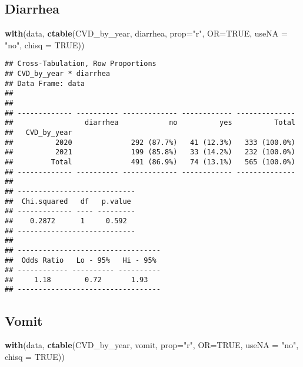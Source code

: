\documentclass[
]{article}
\newenvironment{Shaded}{\begin{snugshade}}{\end{snugshade}}
\newcommand{\AttributeTok}[1]{\textcolor[rgb]{0.13,0.29,0.53}{#1}}
\newcommand{\ConstantTok}[1]{\textcolor[rgb]{0.56,0.35,0.01}{#1}}
\newcommand{\FunctionTok}[1]{\textcolor[rgb]{0.13,0.29,0.53}{\textbf{#1}}}
\newcommand{\NormalTok}[1]{#1}
\newcommand{\StringTok}[1]{\textcolor[rgb]{0.31,0.60,0.02}{#1}}
\begin{document}
\hypertarget{diarrhea}{%
\subsection{Diarrhea}\label{diarrhea}}

\begin{Shaded}
\begin{Highlighting}[]
\FunctionTok{with}\NormalTok{(data, }\FunctionTok{ctable}\NormalTok{(CVD\_by\_year, diarrhea, }\AttributeTok{prop=}\StringTok{"r"}\NormalTok{, }\AttributeTok{OR=}\ConstantTok{TRUE}\NormalTok{, }\AttributeTok{useNA =} \StringTok{"no"}\NormalTok{, }\AttributeTok{chisq =} \ConstantTok{TRUE}\NormalTok{))}
\end{Highlighting}
\end{Shaded}

\begin{verbatim}
## Cross-Tabulation, Row Proportions  
## CVD_by_year * diarrhea  
## Data Frame: data  
## 
## 
## ------------- ---------- ------------- ------------ --------------
##                 diarrhea            no          yes          Total
##   CVD_by_year                                                     
##          2020              292 (87.7%)   41 (12.3%)   333 (100.0%)
##          2021              199 (85.8%)   33 (14.2%)   232 (100.0%)
##         Total              491 (86.9%)   74 (13.1%)   565 (100.0%)
## ------------- ---------- ------------- ------------ --------------
## 
## ----------------------------
##  Chi.squared   df   p.value 
## ------------- ---- ---------
##    0.2872      1     0.592  
## ----------------------------
## 
## ----------------------------------
##  Odds Ratio   Lo - 95%   Hi - 95% 
## ------------ ---------- ----------
##     1.18        0.72       1.93   
## ----------------------------------
\end{verbatim}

\hypertarget{vomit}{%
\subsection{Vomit}\label{vomit}}

\begin{Shaded}
\begin{Highlighting}[]
\FunctionTok{with}\NormalTok{(data, }\FunctionTok{ctable}\NormalTok{(CVD\_by\_year, vomit, }\AttributeTok{prop=}\StringTok{"r"}\NormalTok{, }\AttributeTok{OR=}\ConstantTok{TRUE}\NormalTok{, }\AttributeTok{useNA =} \StringTok{"no"}\NormalTok{, }\AttributeTok{chisq =} \ConstantTok{TRUE}\NormalTok{))}
\end{Highlighting}
\end{Shaded}
\end{document}
